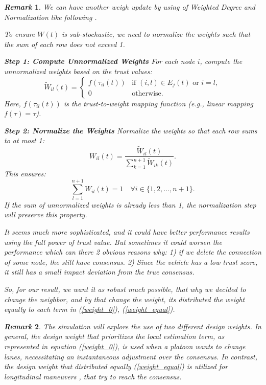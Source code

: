 \documentclass[letterpaper, 10pt, conference]{ieeeconf}  %
\def\eqref#1{(\ref{#1})}
\newtheorem{remark}{\it Remark}%
\begin{document}
\begin{remark}
   We can have another weigh update by using of Weighted Degree and Normalization like following .

To ensure \( W(t) \) is sub-stochastic, we need to normalize the weights such that the sum of each row does not exceed 1.

\textbf{Step 1: Compute Unnormalized Weights}
For each node \( i \), compute the unnormalized weights based on the trust values:
\[
\tilde{W}_{il}(t) = \begin{cases}
f(\tau_{il}(t)) & \text{if } (i, l) \in E_j(t) \text{ or } i = l, \\
0 & \text{otherwise}.
\end{cases}
\]
Here, \( f(\tau_{il}(t)) \) is the trust-to-weight mapping function (e.g., linear mapping \( f(\tau) = \tau \)).

\textbf{Step 2: Normalize the Weights}
Normalize the weights so that each row sums to at most 1:
\[
W_{il}(t) = \frac{\tilde{W}_{il}(t)}{\sum_{k=1}^{n+1} \tilde{W}_{ik}(t)}.
\]
This ensures:
\[
\sum_{l=1}^{n+1} W_{il}(t) = 1 \quad \forall i \in \{1, 2, \dots, n+1\}.
\]
If the sum of unnormalized weights is already less than 1, the normalization step will preserve this property.


It seems much more sophisticated, and it could have better performance results using the full power of trust value. But sometimes it could worsen the performance which can there 2 obvious reasons why: 1) if we delete the connection of some node, the still have consensus. 2) Since the vehicle has a low trust score, it still has a small impact deviation from the true consensus. 

So, for our result, we want it as robust much possible, that why we decided to change the neighbor, and by that change the weight, its distributed the weight equally to each term in \eqref{weight_0}, \eqref{weight_equal}.
\end{remark}

\begin{remark}
The simulation will explore the use of two different design weights. In general, the design weight that prioritizes the local estimation term, as represented in equation \eqref{weight_0}, is used when a platoon wants to change lanes, necessitating an instantaneous adjustment over the consensus. In contrast, the design weight that distributed equally \eqref{weight_equal} is utilized for longitudinal maneuvers , that try to reach the consensus.    
\end{remark}
\end{document}
